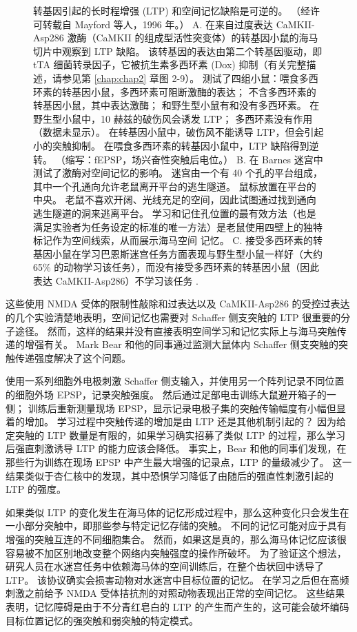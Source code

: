 \begin{figure}[htbp]
	\caption{转基因引起的长时程增强 (LTP) 和空间记忆缺陷是可逆的。 （经许可转载自 Mayford 等人，1996 年。） A. 在来自过度表达 CaMKII-Asp286 激酶（CaMKII 的组成型活性突变体）的转基因小鼠的海马切片中观察到 LTP 缺陷。 该转基因的表达由第二个转基因驱动，即 tTA 细菌转录因子，它被抗生素多西环素 (Dox) 抑制（有关完整描述，请参见第 \ref{chap:chap2} 章图 2-9）。 测试了四组小鼠：喂食多西环素的转基因小鼠，多西环素可阻断激酶的表达； 不含多西环素的转基因小鼠，其中表达激酶； 和野生型小鼠有和没有多西环素。 在野生型小鼠中，10 赫兹的破伤风会诱发 LTP； 多西环素没有作用（数据未显示）。 在转基因小鼠中，破伤风不能诱导 LTP，但会引起小的突触抑制。 在喂食多西环素的转基因小鼠中，LTP 缺陷得到逆转。 （缩写：fEPSP，场兴奋性突触后电位。） B. 在 Barnes 迷宫中测试了激酶对空间记忆的影响。 迷宫由一个有 40 个孔的平台组成，其中一个孔通向允许老鼠离开平台的逃生隧道。 鼠标放置在平台的中央。 老鼠不喜欢开阔、光线充足的空间，因此试图通过找到通向逃生隧道的洞来逃离平台。 学习和记住孔位置的最有效方法（也是满足实验者为任务设定的标准的唯一方法）是老鼠使用四壁上的独特标记作为空间线索，从而展示海马空间 记忆。 C. 接受多西环素的转基因小鼠在学习巴恩斯迷宫任务方面表现与野生型小鼠一样好（大约 65\% 的动物学习该任务），而没有接受多西环素的转基因小鼠（因此表达 CaMKII-Asp286）不学习该任务 .}
	\label{fig:54_9}
\end{figure}


这些使用 NMDA 受体的限制性敲除和过表达以及 CaMKII-Asp286 的受控过表达的几个实验清楚地表明，空间记忆也需要对 Schaffer 侧支突触的 LTP 很重要的分子途径。
然而，这样的结果并没有直接表明空间学习和记忆实际上与海马突触传递的增强有关。
Mark Bear 和他的同事通过监测大鼠体内 Schaffer 侧支突触的突触传递强度解决了这个问题。


使用一系列细胞外电极刺激 Schaffer 侧支输入，并使用另一个阵列记录不同位置的细胞外场 EPSP，记录突触强度。
然后通过足部电击训练大鼠避开箱子的一侧；
训练后重新测量现场 EPSP，显示记录电极子集的突触传输幅度有小幅但显着的增加。
学习过程中突触传递的增加是由 LTP 还是其他机制引起的？
因为给定突触的 LTP 数量是有限的，如果学习确实招募了类似 LTP 的过程，那么学习后强直刺激诱导 LTP 的能力应该会降低。
事实上，Bear 和他的同事们发现，在那些行为训练在现场 EPSP 中产生最大增强的记录点，LTP 的量级减少了。
这一结果类似于杏仁核中的发现，其中恐惧学习降低了由随后的强直性刺激引起的 LTP 的强度。


如果类似 LTP 的变化发生在海马体的记忆形成过程中，那么这种变化只会发生在一小部分突触中，即那些参与特定记忆存储的突触。
不同的记忆可能对应于具有增强的突触互连的不同细胞集合。
然而，如果这是真的，那么海马体记忆应该很容易被不加区别地改变整个网络内突触强度的操作所破坏。
为了验证这个想法，研究人员在水迷宫任务中依赖海马体的空间训练后，在整个齿状回中诱导了 LTP。
该协议确实会损害动物对水迷宫中目标位置的记忆。
在学习之后但在高频刺激之前给予 NMDA 受体拮抗剂的对照动物表现出正常的空间记忆。
这些结果表明，记忆障碍是由于不分青红皂白的 LTP 的产生而产生的，这可能会破坏编码目标位置记忆的强突触和弱突触的特定模式。



